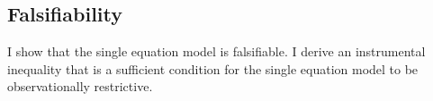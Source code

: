 \documentclass[10pt,a4paper,twoside]{article}
\newcommand\independent{\protect\mathpalette{\protect\independenT}{\perp}}
\def\independenT#1#2{\mathrel{\rlap{$#1#2$}\mkern2mu{#1#2}}}
\numberwithin{equation}{section}
\begin{document}
\subsection{Falsifiability}
I show that the single equation model is falsifiable. I derive an instrumental inequality \citep{p95b} that is a sufficient condition for the single equation model to be observationally restrictive. 
\end{document}
